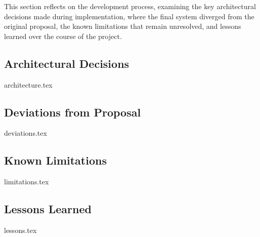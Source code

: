 This section reflects on the development process, examining the key architectural decisions made during implementation, where the final system diverged from the original proposal, the known limitations that remain unresolved, and lessons learned over the course of the project.

\subsection{Architectural Decisions}
\label{sec:discussion:architecture}
{architecture.tex}

\subsection{Deviations from Proposal}
\label{sec:discussion:deviations}
{deviations.tex}

\subsection{Known Limitations}
\label{sec:discussion:limitations}
{limitations.tex}

\subsection{Lessons Learned}
\label{sec:discussion:lessons}
{lessons.tex}

